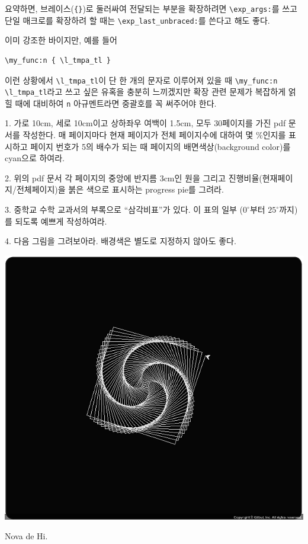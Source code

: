 \documentclass[a4paper,amsmath]{oblivoir}
\begin{document}
요약하면, 브레이스(\verb|{}|)로 둘러싸여 전달되는 부분을 확장하려면 \verb|\exp_args:|를 쓰고
단일 매크로를 확장하려 할 때는 \verb|\exp_last_unbraced:|를 쓴다고 해도 좋다.

이미 강조한 바이지만, 예를 들어 
\begin{verbatim}
\my_func:n { \l_tmpa_tl }
\end{verbatim}
이런 상황에서 \verb|\l_tmpa_tl|이 단 한 개의 문자로 이루어져 있을 때 \verb|\my_func:n \l_tmpa_tl|라고 쓰고 싶은 유혹을 충분히 느끼겠지만 확장 관련 문제가 복잡하게 얽힐 때에 대비하여 \verb|n| 아규멘트라면 중괄호를 꼭 써주어야 한다. 


\vfill

\begin{questionp}

 1. 가로 10cm, 세로 10cm이고 상하좌우 여백이 1.5cm, 모두 30페이지를 가진 pdf 문서를 작성한다. 매 페이지마다 현재 페이지가 전체 페이지수에 대하여 몇 \%인지를 표시하고 페이지 번호가 5의 배수가 되는 때 페이지의 배면색상(background color)를 cyan으로 하여라.

\bigskip

 2. 위의 pdf 문서 각 페이지의 중앙에 반지름 3cm인 원을 그리고 진행비율(현재페이지/전체페이지)을 붉은 색으로 표시하는 progress pie를 그려라.

\bigskip

 3. 중학교 수학 교과서의 부록으로 “삼각비표”가 있다. 이 표의 일부 ($0^\circ$부터 $25^\circ$까지)를 되도록 예쁘게 작성하여라.

\bigskip

 4. 다음 그림을 그려보아라. 배경색은 별도로 지정하지 않아도 좋다.

\includegraphics[width=.7\linewidth]{Screenshot-4}

\end{questionp}


\vfill
\hfill Nova de Hi.
\end{document}
